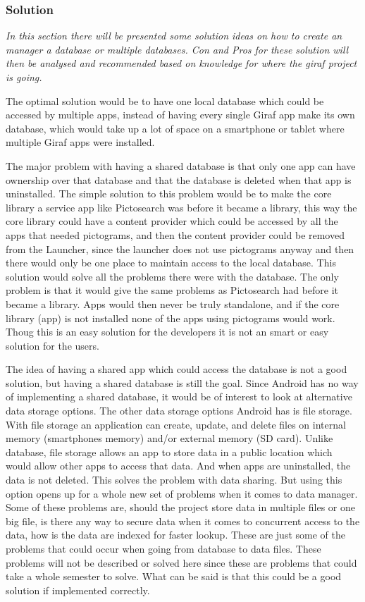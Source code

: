 \subsubsection{Solution}
\textit{In this section there will be presented some solution ideas on how to create an manager a database or multiple databases. Con and Pros for these solution will then be analysed and recommended based on knowledge for where the giraf project is going.}

The optimal solution would be to have one local database which could be accessed by multiple apps, instead of having every single Giraf app make its own database, which would take up a lot of space on a smartphone or tablet where multiple Giraf apps were installed.

The major problem with having a shared database is that only one app can have ownership over that database and that the database is deleted when that app is uninstalled. The simple solution to this problem would be to make the core library a service app like Pictosearch was before it became a library, this way the core library could have a content provider which could be accessed by all the apps that needed pictograms, and then the content provider could be removed from the Launcher, since the launcher does not use pictograms anyway and then there would only be one place to maintain access to the local database. 
This solution would solve all the problems there were with the database. The only problem is that it would give the same problems as Pictosearch had before it became a library. Apps would then never be truly standalone, and if the core library (app) is not installed none of the apps using pictograms would work. Thoug this is an easy solution for the developers it is not an smart or easy solution for the users.

The idea of having a shared app which could access the database is not a good solution, but having a shared database is still the goal. Since Android has no way of implementing a shared database, it would be of interest to look at alternative data storage options. The other data storage options Android has is file storage. With file storage an application can create, update, and delete files on internal memory (smartphones memory) and/or external memory (SD card). Unlike database, file storage allows an app to store data in a public location which would allow other apps to access that data. And when apps are uninstalled, the data is not deleted. This solves the problem with data sharing. But using this option opens up for a whole new set of problems when it comes to data manager. Some of these problems are, should the project store data in multiple files or one big file, is there any way to secure data when it comes to concurrent access to the data, how is the data are indexed for faster lookup. These are just some of the problems that could occur when going from database to data files.   
These problems will not be described or solved here since these are problems that could take a whole semester to solve. What can be said is that this could be a good solution if implemented correctly.